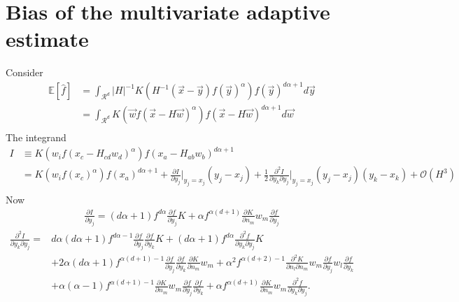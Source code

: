 \chapter{Bias of the multivariate adaptive estimate}
\label{app:exp}
Consider
\begin{equation}
	\begin{split}
		\mathbb{E}[\hat{f}]&=\int_{\mathcal{R}^d}|H|^{-1}K(H^{-1}(\vec{x}-\vec{y})f(\vec{y})^\alpha)f(\vec{y})^{d\alpha+1}d\vec{y}\\
		&=\int_{\mathcal{R}^d}K(\vec{w}f(\vec{x}-H\vec{w})^\alpha)f(\vec{x}-H\vec{w})^{d\alpha+1}d\vec{w}\\
	\end{split}
\end{equation}
The integrand
\begin{equation}
	\begin{split}
		I&\equiv K(w_if(x_c-H_{cd}w_d)^\alpha)f(x_a-H_{ab}w_b)^{d\alpha+1}\\
		&=K(w_if(x_c)^\alpha)f(x_a)^{d\alpha+1}+\frac{\partial I}{\partial y_j}\bigg|_{y_j=x_j}(y_j-x_j)+\frac{1}{2}\frac{\partial^2I}{\partial y_k\partial y_j}\bigg|_{y_j=x_j}(y_j-x_j)(y_k-x_k)+\mathcal{O}(H^3)\\
	\end{split}
\end{equation}
Now
\begin{equation}
	\begin{split}
		\frac{\partial I}{\partial y_j}=(d\alpha+1)f^{d\alpha}\frac{\partial f}{\partial y_j}K+\alpha f^{\alpha(d+1)} \frac{\partial K}{\partial n_m}w_m\frac{\partial f}{\partial y_j}
	\end{split}
\end{equation}
\begin{equation}
	\begin{split}
		\frac{\partial^2 I}{\partial y_k\partial y_j}=&d\alpha(d\alpha+1)f^{d\alpha-1}\frac{\partial f}{\partial y_j}\frac{\partial f}{\partial y_k}K+(d\alpha+1)f^{d\alpha}\frac{\partial^2 f}{\partial y_k\partial y_j}K\\
		&+2\alpha(d\alpha+1)f^{\alpha(d+1)-1}\frac{\partial f}{\partial y_j}\frac{\partial f}{\partial y_k}\frac{\partial K}{\partial n_m}w_m+\alpha^2 f^{\alpha(d+2)-1} \frac{\partial^2 K}{\partial n_l\partial n_m}w_m \frac{\partial f}{\partial y_j}w_l \frac{\partial f}{\partial y_k}\\
		&+\alpha(\alpha-1)f^{\alpha(d+1)-1} \frac{\partial K}{\partial n_m}w_m \frac{\partial f}{\partial y_j}\frac{\partial f}{\partial y_k}+\alpha f^{\alpha(d+1)} \frac{\partial K}{\partial n_m}w_m \frac{\partial^2 f}{\partial y_k\partial y_j}.
	\end{split}
\end{equation}
